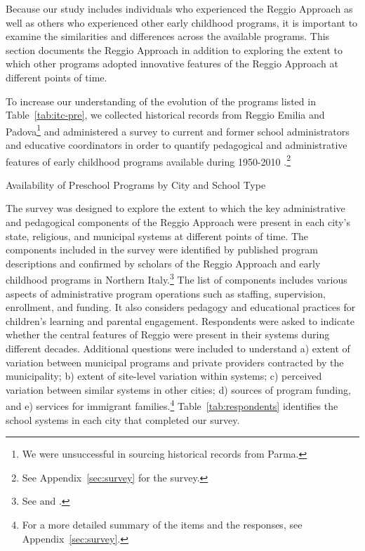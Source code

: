 Because our study includes individuals who experienced the Reggio Approach as well as others who experienced other early childhood programs, it is important to examine the similarities and differences across the available programs. This section documents the Reggio Approach in addition to exploring the extent to which other programs adopted innovative features of the Reggio Approach at different points of time.

To increase our understanding of the evolution of the programs listed in Table~\ref{tab:itc-pre}, we collected historical records from Reggio Emilia and Padova\footnote{We were unsuccessful in sourcing historical records from Parma.} \citep{Padova-Admin-Data_1964-2011,Reggio-Admin-data_1966-2006,Reggio-Annual-Journals_1994-2011} and administered a survey to current and former school administrators and educative coordinators in order to quantify pedagogical and administrative features of early childhood programs available during 1950-2010 \citep{CEHD_2016_Historical-Analysis}.\footnote{See Appendix~\ref{sec:survey} for the survey.}
~\\
\begin{table}[H]
\centering
\caption{Availability of Preschool Programs by City and School Type}\label{tab:itc-pre}
\begin{adjustbox}{width=\textwidth}
\begin{threeparttable}
	
\begin{tablenotes}
\end{tablenotes}
\end{threeparttable}
\end{adjustbox}
\end{table}

The survey was designed to explore the extent to which the key administrative and pedagogical components of the Reggio Approach were present in each city's state, religious, and municipal systems at different points of time. The components included in the survey were identified by published program descriptions and confirmed by scholars of the Reggio Approach and early childhood programs in Northern Italy.\footnote{See \citet{Edwards-etal-eds_1998_Hundred-Languages} and \citet{Corsaro_2008_Policy-Practice}.} The list of components includes various aspects of administrative program operations such as staffing, supervision, enrollment, and funding. It also considers pedagogy and educational practices for children's learning and parental engagement. Respondents were asked to indicate whether the central features of Reggio were present in their systems during different decades. Additional questions were included to understand a) extent of variation between municipal programs and private providers contracted by the municipality; b) extent of site-level variation within systems; c) perceived variation between similar systems in other cities; d) sources of program funding, and e) services for immigrant families.\footnote{For a more detailed summary of the items and the responses, see Appendix~\ref{sec:survey}.} Table~\ref{tab:respondents} identifies the school systems in each city that completed our survey.

